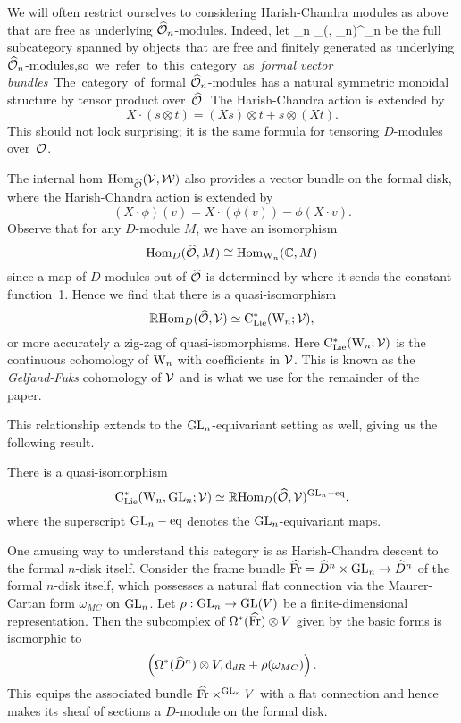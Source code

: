 We will often restrict ourselves to considering Harish-Chandra modules as above that are free as underlying $\widehat{\mathcal O}_n$-modules. 
Indeed, let
\ben
\VB_n \subset \Mod_{(\Vect, \GL_n)}^{\cO_n}
\een
be the full subcategory spanned by objects that are free and finitely generated as underlying $\widehat{\mathcal O}_n$-modules,\si
so we refer to this category as {\em formal vector bundles}.

The category of formal $\widehat{\mathcal O}_n$-modules has a natural symmetric monoidal structure by tensor product over~$\widehat{\mathcal O}$. The Harish-Chandra action is extended by
\[
X \cdot (s \otimes t) = (X s) \otimes t + s \otimes (Xt). 
\]
This should not look surprising; it is the same formula for tensoring
$D$-modules over~$\mathcal O$. 

The internal hom ${\rm Hom}_{\widehat{\mathcal O}}(\mathcal{V},\mathcal{W})$ also provides a vector bundle on the formal disk, 
where the Harish-Chandra action is extended by
\[
(X \cdot \phi)(v) = X \cdot (\phi(v)) - \phi(X\cdot v). 
\]
Observe that for any $D$-module $M$, we have an isomorphism
\[
{\rm Hom}_{D}(\widehat{\mathcal O}, M) \cong {\rm Hom}_{{{\rm W}_n}}(\mathbb C, M)
\]
since a map of $D$-modules out of $\widehat{\mathcal O}$ is determined by where it sends the constant function~1. 
Hence we find that there is a quasi-isomorphism 
\[
\mathbb R{\rm Hom}_{D}(\widehat{\mathcal O}, \mathcal{V}) \simeq {\rm C}_{{\rm Lie}}^*({{\rm W}_n} ; \mathcal{V}),
\]
or more accurately a zig-zag of quasi-isomorphisms. Here
${\rm C}_{{\rm Lie}}^*({{\rm W}_n} ; \mathcal{V})$ is the continuous cohomology of ${{\rm W}_n}$ with
coefficients in $\mathcal{V}$. This is known as the {\em Gelfand-Fuks}
cohomology of $\mathcal{V}$ and is what we use for the remainder of the
paper. 

This relationship extends to the ${\rm GL}_n$-equivariant setting as well, giving us the following result.

\begin{lemma}
There is a quasi-isomorphism
\[
{\rm C}_{{\rm Lie}}^*({{\rm W}_n},{\rm GL}_n; \mathcal{V}) \simeq \mathbb R {\rm Hom}_D(\widehat{\mathcal O},\mathcal{V})^{{\rm GL}_n-{\rm eq}},
\]
where the superscript ${\rm GL}_n-{\rm eq}$ denotes the ${\rm GL}_n$-equivariant maps.
\end{lemma}

\begin{rmk}
One amusing way to understand this category is as Harish-Chandra descent to the formal $n$-disk itself. 
Consider the frame bundle $\widehat{{\rm Fr}} = \widehat{D}^n \times {\rm GL}_n \to \widehat{D}^n$ of the formal $n$-disk itself, 
which possesses a natural flat connection via the Maurer-Cartan form $\omega_{MC}$ on ${\rm GL}_n$. 
Let $\rho: {\rm GL}_n \to {\rm GL}(V)$ be a finite-dimensional representation. 
Then the subcomplex of $\Omega^*(\widehat{{\rm Fr}})\otimes V$ given by the basic forms is isomorphic to
\[
\left(\Omega^*(\widehat{D}^n) \otimes V, {\rm d}_{dR} + \rho(\omega_{MC}) \right).
\]
This equips the associated bundle $\widehat{{\rm Fr}}\times^{{\rm GL}_n} V$ with a flat connection and 
hence makes its sheaf of sections a $D$-module on the formal disk.
\end{rmk}

